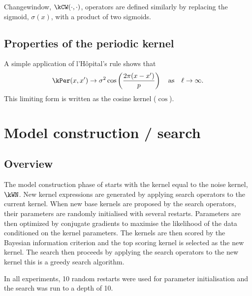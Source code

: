 Changewindow, $\kCW(\cdot,\cdot)$, operators are defined similarly by replacing the sigmoid, $\sigma(x)$, with a product of two sigmoids.

\subsection{Properties of the periodic kernel}

A simple application of l'H\^opital's rule shows that
\begin{equation}
\kPer(x, x') \to \sigma^2\cos\left(\frac{2 \pi (x - x')}{p}\right) \quad \textrm{as} \quad\ell \to \infty.
\end{equation}
This limiting form is written as the cosine kernel ($\cos$).

\section{Model construction / search}

\subsection{Overview}

The model construction phase of \procedurename{} starts with the kernel equal to the noise kernel, $\kWN$.
New kernel expressions are generated by applying search operators to the current kernel.
When new base kernels are proposed by the search operators, their parameters are randomly initialised with several restarts.
Parameters are then optimized by conjugate gradients to maximise the likelihood of the data conditioned on the kernel parameters.
The kernels are then scored by the Bayesian information criterion and the top scoring kernel is selected as the new kernel.
The search then proceeds by applying the search operators to the new kernel \ie this is a greedy search algorithm.

In all experiments, 10 random restarts were used for parameter initialisation and the search was run to a depth of 10.

